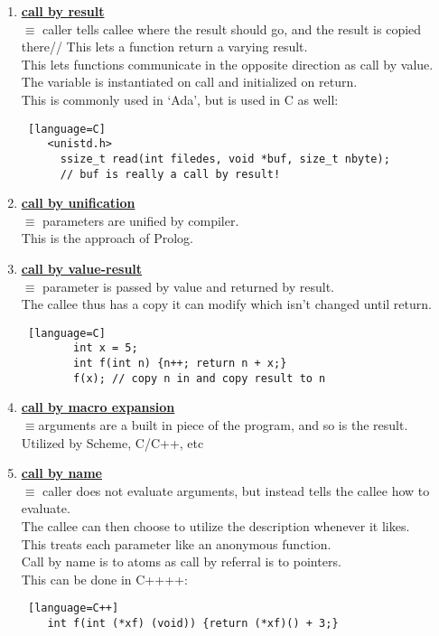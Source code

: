 \documentclass[../../lecture_notes.tex]{subfiles}
\begin{document}
\begin{enumerate} [itemsep=0mm]
	\item \textbf{\underline{call by result}}\\
		$\equiv$ caller tells callee where the result should go, and the result is copied there//
		This lets a function return a varying result.\\
		This lets functions communicate in the opposite direction as call by value.\\
		The variable is instantiated on call and initialized on return.\\
		This is commonly used in ‘Ada’, but is used in C as well:
		\begin{lstlisting} [language=C]
	<unistd.h>
	  ssize_t read(int filedes, void *buf, size_t nbyte);
	  // buf is really a call by result!
		\end{lstlisting}
	\item \textbf{\underline{call by unification}}\\
		$\equiv$ parameters are unified by compiler.\\
		This is the approach of Prolog.
	\item \textbf{\underline{call by value-result}}\\
		$\equiv$ parameter is passed by value and returned by result.\\
		The callee thus has a copy it can modify which isn’t changed until return.
		\begin{lstlisting} [language=C]
		int x = 5;
		int f(int n) {n++; return n + x;}
		f(x); // copy n in and copy result to n
		\end{lstlisting}
	\item \textbf{\underline{call by macro expansion}}\\
		$\equiv$arguments are a built in piece of the program, and so is the result.\\
		Utilized by Scheme, C/C++, etc
	\item \textbf{\underline{call by name}}\\
		$\equiv$ caller does not evaluate arguments, but instead tells the callee how to evaluate.\\
		The callee can then choose to utilize the description whenever it likes.\\
		This treats each parameter like an anonymous function.\\
		Call by name is to atoms as call by referral is to pointers.\\
		This can be done in C++++:
		\begin{lstlisting} [language=C++]
	int f(int (*xf) (void)) {return (*xf)() + 3;}

\end{lstlisting}
\end{enumerate}
\end{document}
